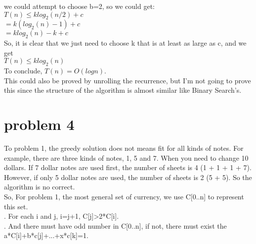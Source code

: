 \documentclass[]{article}
\begin{document}
	\noindent we could attempt to choose b=2, so we could get:   \\
	
		$T(n) \leq klog_{2}(n/2) + c$ \\ 
		
		$= k(log_{2}(n)-1) + c$ \\ 
		
		$= klog_{2}(n) - k + c$ \\ 
		
	\noindent So, it is clear that we just need to choose k that is at least as large as c, and we get \\
	
	$T(n) \leq klog_{2}(n)$ \\ 
	
	\noindent To conclude, $T(n)=O(log n)$. \\
	
	\noindent This could also be proved by unrolling the recurrence, but I'm not going to prove this since the structure of the algorithm is almost similar like Binary Search's.
	
	
	\clearpage
	
	\section{problem 4}
	
	To problem 1, the greedy solution does not means fit for all kinds of notes. For example, there are three kinds of notes, 1, 5 and 7. When you need to change 10 dollars. If 7 dollar notes are used first, the number of sheets is 4 (1 + 1 + 1 + 7). However, if only 5 dollar notes are used, the number of sheets is 2 (5 + 5). So the algorithm is no correct.   \\
	
	\noindent So, For problem 1, the most general set of currency, we use C[0..n] to represent this set. \\
	
	. For each i and j, i=j+1, C[j]\textgreater 2*C[i]. \\
	
	. And there must have odd number in C[0..n], if not, there must exist the a*C[i]+b*c[j]+...+x*c[k]=1.
	
\end{document}
